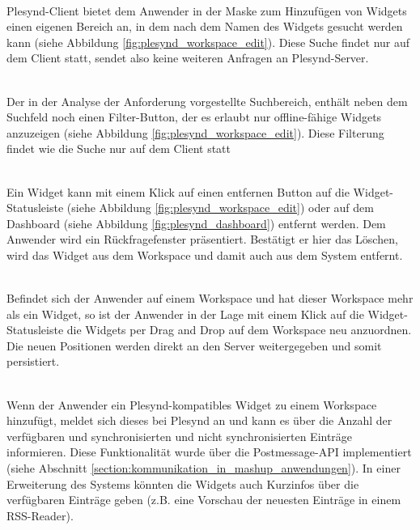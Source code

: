 \textbullet{}  \emph{\requirementWidgetFilterName}\\
Plesynd-Client bietet dem Anwender in der Maske zum Hinzufügen von Widgets einen eigenen Bereich an, in dem nach dem Namen des Widgets gesucht werden kann (siehe Abbildung \ref{fig:plesynd_workspace_edit}). Diese Suche findet nur auf dem Client statt, sendet also keine weiteren Anfragen an Plesynd-Server.

\textbullet{}  \emph{\requirementWidgetFilterOnline}\\
Der in der Analyse der Anforderung  vorgestellte Suchbereich, enthält neben dem Suchfeld noch einen Filter-Button, der es erlaubt nur offline-fähige Widgets anzuzeigen (siehe Abbildung \ref{fig:plesynd_workspace_edit}). Diese Filterung findet wie die Suche nur auf dem Client statt 

\textbullet{}  \emph{\requirementWidgetDelete}\\
Ein Widget kann mit einem Klick auf einen entfernen Button auf die Widget-Statusleiste (siehe Abbildung \ref{fig:plesynd_workspace_edit}) oder auf dem Dashboard (siehe Abbildung \ref{fig:plesynd_dashboard}) entfernt werden. Dem Anwender wird ein Rückfragefenster präsentiert. Bestätigt er hier das Löschen, wird das Widget aus dem Workspace und damit auch aus dem System entfernt.

\textbullet{}  \emph{\requirementWidgetSortDragNDrop}\\
Befindet sich der Anwender auf einem Workspace und hat dieser Workspace mehr als ein Widget, so ist der Anwender in der Lage mit einem Klick auf die Widget-Statusleiste die Widgets per Drag and Drop auf dem Workspace neu anzuordnen. Die neuen Positionen werden direkt an den Server weitergegeben und somit persistiert.

\textbullet{}  \emph{\requirementWidgetInformSystem}\\
Wenn der Anwender ein Plesynd-kompatibles Widget zu einem Workspace hinzufügt, meldet sich dieses bei Plesynd an und kann es über die Anzahl der verfügbaren und synchronisierten und nicht synchronisierten Einträge informieren. Diese Funktionalität wurde über die Postmessage-API implementiert (siehe Abschnitt \ref{section:kommunikation_in_mashup_anwendungen}). In einer Erweiterung des Systems könnten die Widgets auch Kurzinfos über die verfügbaren Einträge geben (z.B. eine Vorschau der neuesten Einträge in einem RSS-Reader).

